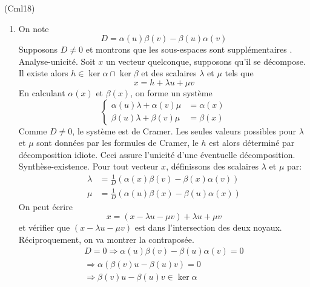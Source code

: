 \begin{tiny}(Cml18)\end{tiny}
\begin{enumerate}
  \item On note
\begin{displaymath}
  D =\alpha(u)\beta(v) - \beta(u)\alpha(v)
\end{displaymath}
Supposons $D\neq 0$  et montrons que les sous-espaces sont supplémentaires .\newline
Analyse-unicité. Soit $x$ un vecteur quelconque, supposons qu'il se décompose. Il existe alors $h\in \ker \alpha \cap \ker \beta$ et des scalaires $\lambda$ et $\mu$ tels que 
\begin{displaymath}
  x = h + \lambda u + \mu v
\end{displaymath}
En calculant $\alpha(x)$ et $\beta(x)$, on forme un système
\begin{displaymath}
\left\lbrace  
  \begin{aligned}
    \alpha(u)\lambda + \alpha(v) \mu &= \alpha(x) \\
    \beta(u) \lambda + \beta(v) \mu &= \beta(x)
  \end{aligned}
\right. 
\end{displaymath}
Comme $D\neq0$, le système est de Cramer. Les seules valeurs possibles pour $\lambda$ et $\mu$ sont données par les formules de Cramer, le $h$ est alors déterminé par décomposition idiote. Ceci assure l'unicité d'une éventuelle décomposition.\newline
Synthèse-existence. Pour tout vecteur $x$, définissons des scalaires $\lambda$ et $\mu$ par:
\begin{align*}
  \lambda &= \frac{1}{D}(\alpha(x)\beta(v)-\beta(x)\alpha(v)) \\
  \mu &= \frac{1}{D}(\alpha(u)\beta(x)-\beta(u)\alpha(x)) 
\end{align*}
On peut écrire
\begin{displaymath}
  x = (x-\lambda u - \mu v) + \lambda u + \mu v
\end{displaymath}
et vérifier que $(x-\lambda u - \mu v)$ est dans l'intersection des deux noyaux.\newline
Réciproquement, on va montrer la contraposée.
\begin{multline*}
  D=0 \Rightarrow \alpha(u)\beta(v) - \beta(u)\alpha(v) = 0 \\
\Rightarrow \alpha\left( \beta(v)u-\beta(u)v\right) = 0\\
\Rightarrow \beta(v)u-\beta(u)v \in \ker \alpha

\end{multline*}
\end{enumerate}
